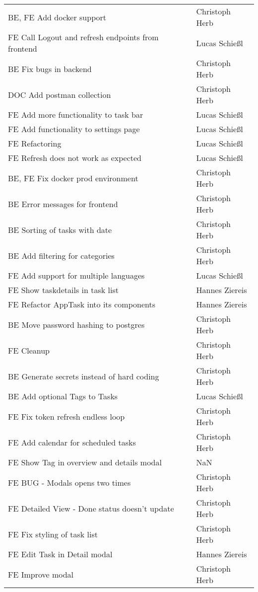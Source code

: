 \begin{longtable}{ll}
BE, FE Add docker support & Christoph Herb \\
FE Call Logout and refresh endpoints from frontend & Lucas Schießl \\
BE Fix bugs in backend & Christoph Herb \\
DOC Add postman collection & Christoph Herb \\
FE Add more functionality to task bar & Lucas Schießl \\
FE Add functionality to settings page & Lucas Schießl \\
FE Refactoring & Lucas Schießl \\
FE Refresh does not work as expected & Lucas Schießl \\
BE, FE Fix docker prod environment & Christoph Herb \\
BE Error messages for frontend & Christoph Herb \\
BE Sorting of tasks with date & Christoph Herb \\
BE Add filtering for categories & Christoph Herb \\
FE Add support for multiple languages & Lucas Schießl \\
FE Show taskdetails in task list & Hannes Ziereis \\
FE Refactor AppTask into its components & Hannes Ziereis \\
BE Move password hashing to postgres & Christoph Herb \\
FE Cleanup & Christoph Herb \\
BE Generate secrets instead of hard coding & Christoph Herb \\
BE Add optional Tags to Tasks & Lucas Schießl \\
FE Fix token refresh endless loop & Christoph Herb \\
FE Add calendar for scheduled tasks & Christoph Herb \\
FE Show Tag in overview and details modal & NaN \\
FE BUG - Modals opens two times & Christoph Herb \\
FE Detailed View - Done status doesn't update & Christoph Herb \\
FE Fix styling of task list & Christoph Herb \\
FE  Edit Task in Detail modal & Hannes Ziereis \\
FE Improve modal & Christoph Herb \\
\end{longtable}
